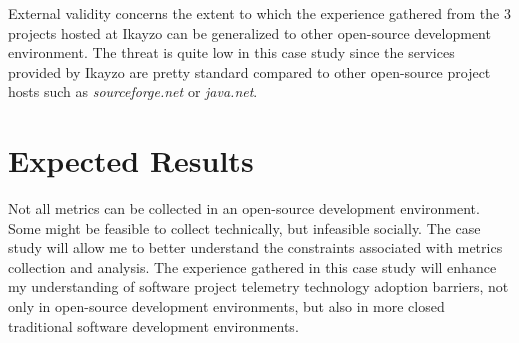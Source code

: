 External validity concerns the extent to which the experience gathered from the 3 projects hosted at Ikayzo can be generalized to other open-source development environment. 
The threat is quite low in this case study since the services provided by Ikayzo are pretty standard compared to other open-source project hosts such as \textit{sourceforge.net} or \textit{java.net}. 






\section{Expected Results} \label{EvaluationInIkayzo:Results}

Not all metrics can be collected in an open-source development environment. Some might be feasible to collect technically, but infeasible socially. The case study will allow me to better understand the constraints associated with metrics collection and analysis. The experience gathered in this case study will enhance my understanding of software project telemetry technology adoption barriers, not only in open-source development environments, but also in more closed traditional software development environments.






%
%
%


